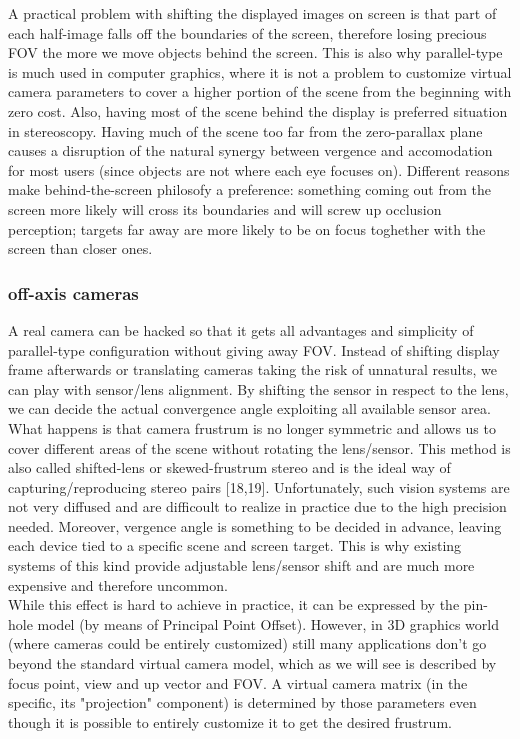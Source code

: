 A practical problem with shifting the displayed images on screen is that part of each half-image falls off the boundaries of the screen, therefore losing precious FOV the more we move objects behind the screen. This is also why parallel-type is much used in computer graphics, where it is not a problem to customize virtual camera parameters to cover a higher portion of the scene from the beginning with zero cost. Also, having most of the scene behind the display is preferred situation in stereoscopy. Having much of the scene too far from the zero-parallax plane causes a disruption of the natural synergy between vergence and accomodation for most users (since objects are not where each eye focuses on). Different reasons make behind-the-screen philosofy a preference: something coming out from the screen more likely will cross its boundaries and will screw up occlusion perception; targets far away are more likely to be on focus toghether with the screen than closer ones.

\subsubsection{off-axis cameras}
A real camera can be hacked so that it gets all advantages and simplicity of parallel-type configuration without giving away FOV. Instead of shifting display frame afterwards or translating cameras taking the risk of unnatural results, we can play with sensor/lens alignment. By shifting the sensor in respect to the lens, we can decide the actual convergence angle exploiting all available sensor area. What happens is that camera frustrum is no longer symmetric and allows us to cover different areas of the scene without rotating the lens/sensor. This method is also called shifted-lens or skewed-frustrum stereo and is the ideal way of capturing/reproducing stereo pairs [18,19]. Unfortunately, such vision systems are not very diffused and are difficoult to realize in practice due to the high precision needed. Moreover, vergence angle is something to be decided in advance, leaving each device tied to a specific scene and screen target. This is why existing systems of this kind provide adjustable lens/sensor shift and are much more expensive and therefore uncommon.\\
While this effect is hard to achieve in practice, it can be expressed by the pin-hole model (by means of Principal Point Offset). However, in 3D graphics world (where cameras could be entirely customized) still many applications don’t go beyond the standard virtual camera model, which as we will see is described by focus point, view and up vector and FOV. A virtual camera matrix (in the specific, its "projection" component) is determined by those parameters even though it is possible to entirely customize it to get the desired frustrum.

